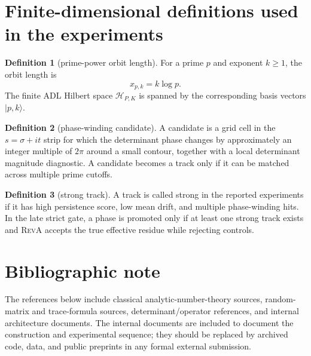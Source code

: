 \documentclass[11pt]{article}
\newcommand{\RevA}{\textsc{RevA}}
\theoremstyle{definition}
\newtheorem{definition}{Definition}
\theoremstyle{plain}
\begin{document}
\appendix

\section{Finite-dimensional definitions used in the experiments}

\begin{definition}[prime-power orbit length]
For a prime $p$ and exponent $k\ge1$, the orbit length is
\begin{equation}
  x_{p,k}=k\log p.
\end{equation}
The finite ADL Hilbert space $\mathcal H_{P,K}$ is spanned by the corresponding basis vectors $|p,k\rangle$.
\end{definition}

\begin{definition}[phase-winding candidate]
A candidate is a grid cell in the $s=\sigma+it$ strip for which the determinant phase changes by approximately an integer multiple of $2\pi$ around a small contour, together with a local determinant magnitude diagnostic.  A candidate becomes a track only if it can be matched across multiple prime cutoffs.
\end{definition}

\begin{definition}[strong track]
A track is called strong in the reported experiments if it has high persistence score, low mean drift, and multiple phase-winding hits.  In the late strict gate, a phase is promoted only if at least one strong track exists and \RevA{} accepts the true effective residue while rejecting controls.
\end{definition}

\section{Bibliographic note}

The references below include classical analytic-number-theory sources, random-matrix and trace-formula sources, determinant/operator references, and internal architecture documents.  The internal documents are included to document the construction and experimental sequence; they should be replaced by archived code, data, and public preprints in any formal external submission.
\end{document}
